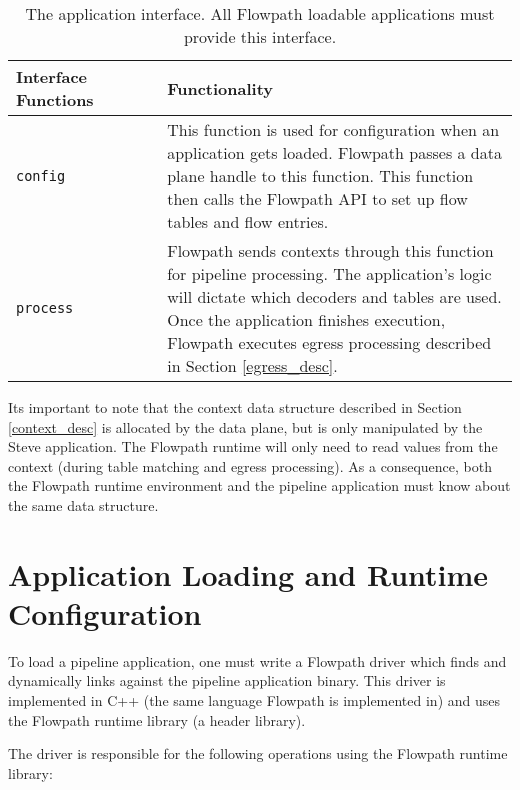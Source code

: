 \begin{table}
\begin{center}
\begin{tabular}{| p{0.3\linewidth} | p{0.7\linewidth} |}
\hline
Interface Functions & Functionality \\

\hline

\texttt{config} & This function is used for configuration when an application gets loaded. Flowpath passes a data plane handle to this function. This function then calls the Flowpath API to set up flow tables and flow entries. \\

\hline

\texttt{process} & Flowpath sends contexts through this function for pipeline processing. The application's logic will dictate which decoders and tables are used. Once the application finishes execution, Flowpath executes egress processing described in Section \ref{egress_desc}. \\

\hline

\end{tabular}
\end{center}
\caption{The application interface. All Flowpath loadable applications must provide this interface.}
\label{tbl:steve_api}
\end{table}

Its important to note that the context data structure described in Section \ref{context_desc} is allocated by the data plane, but is only manipulated by the Steve application. The Flowpath runtime will only need to read values from the context (during table matching and egress processing). As a consequence, both the Flowpath runtime environment and the pipeline application must know about the same data structure.

\section{Application Loading and Runtime Configuration} \label{config_guide}

To load a pipeline application, one must write a Flowpath driver which finds and dynamically links against the pipeline application binary. This driver is implemented in C++ (the same language Flowpath is implemented in) and uses the Flowpath runtime library (a header library).

The driver is responsible for the following operations using the Flowpath runtime library:

